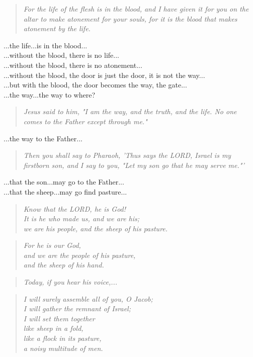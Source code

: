\documentclass[10pt,oneside,footinclude=true,headinclude=true]{scrbook} %
\newcommand\quot[1]{
	\begin{quote}\textit{\small#1}\end{quote}
}
\begin{document}
\quot{For the life of the flesh is in the blood, and I have given it for you on the altar to make atonement for your souls, for it is the blood that makes atonement by the life.}

\noindent...the life...is in the blood...\\
...without the blood, there is no life...\\
...without the blood, there is no atonement...\\
...without the blood, the door is just the door, it is not the way...\\
...but with the blood, the door becomes the way, the gate...\\

\noindent...the way...the way to where?

\quot{Jesus said to him, "I am the way, and the truth, and the life. No one comes to the Father except through me."}

\noindent...the way to the Father...

\quot{Then you shall say to Pharaoh, 'Thus says the LORD, Israel is my firstborn son,  and I say to you, "Let my son go that he may serve me."'}

\noindent...that the son...may go to the Father...\\
...that the sheep...may go find pasture...

\quot{Know that the LORD, he is God!\\
\hspace*{5mm}It is he who made us, and we are his;\\
\hspace*{5mm}we are his people, and the sheep of his pasture.}

\quot{For he is our God,\\
\hspace*{5mm}and we are the people of his pasture,\\
\hspace*{5mm}and the sheep of his hand.}

\quot{Today, if you hear his voice,...}

\quot{I will surely assemble all of you, O Jacob;\\
\hspace*{5mm}I will gather the remnant of Israel;\\
I will set them together\\
\hspace*{5mm}like sheep in a fold,\\
like a flock in its pasture,\\
\hspace*{5mm}a noisy multitude of men.}
\end{document}
